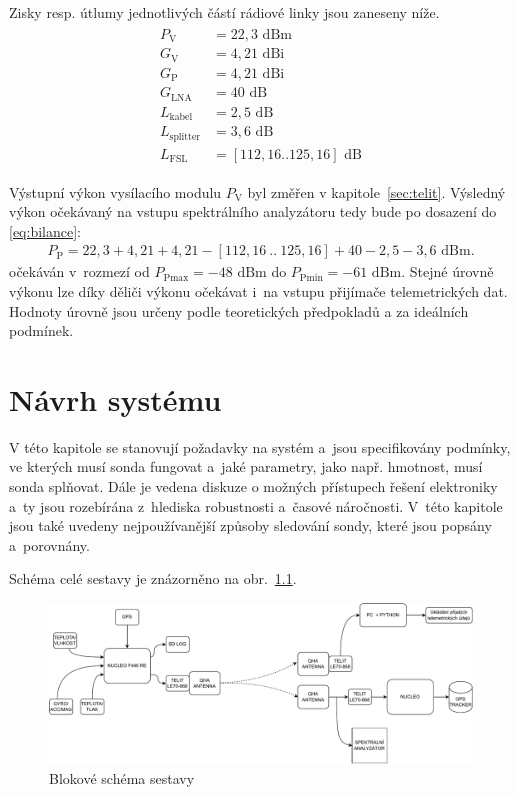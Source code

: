 \documentclass[twoside]{ctuthesis}
\newcommand{\mt}[1]{\text{#1}}
\theoremstyle{plain}
\theoremstyle{definition}
\theoremstyle{note}
\begin{document}
		Zisky resp. útlumy jednotlivých částí rádiové linky jsou zaneseny níže.
		\begin{align*}
			\begin{split}
				P_\mt{V} &= 22{,}3\mt{ dBm}\\
				G_\mt{V} &= 4{,}21\mt{ dBi}\\
				G_\mt{P} &= 4{,}21\mt{ dBi}\\
				G_\mt{LNA} &= 40 \mt{ dB}\\
				L_\mt{kabel} &= 2{,}5\mt{ dB}\\
				L_\mt{splitter} &= 3{,}6\mt{ dB}\\
				L_\mt{FSL} &= [112{,}16 .. 125{,}16]\mt{ dB}
			\end{split}
		\end{align*}

		Výstupní výkon vysílacího modulu $P_\mt{V}$ byl změřen v kapitole~\ref{sec:telit}. Výsledný výkon očekávaný na vstupu spektrálního analyzátoru tedy bude po dosazení do \eqref{eq:bilance}:
		\begin{align}
			P_\mt{P} = 22{,}3 + 4{,}21 + 4{,}21 - [112{,}16~..~125{,}16] + 40 - 2{,}5 - 3{,}6\mt{ dBm}.
		\end{align}
		očekáván v~rozmezí od $P_\mt{Pmax} = -48\mt{ dBm}$ do $P_\mt{Pmin} = -61\mt{ dBm}$. Stejné úrovně výkonu lze díky děliči výkonu očekávat i~na vstupu přijímače telemetrických dat. Hodnoty úrovně jsou určeny podle teoretických předpokladů a za ideálních podmínek. 















\chapter{Návrh systému}
V této kapitole se stanovují požadavky na systém a~jsou specifikovány podmínky, ve kterých musí sonda fungovat a~jaké parametry, jako např. hmotnost, musí sonda splňovat. Dále je vedena  diskuze o možných přístupech řešení elektroniky a~ty jsou rozebírána z~hlediska robustnosti a~časové náročnosti. V~této kapitole jsou také uvedeny nejpoužívanější způsoby sledování sondy, které jsou popsány a~porovnány.

Schéma celé sestavy je znázorněno na obr.~\ref{fig:sestava:blokac}.
\begin{figure}
	\centering
	\includegraphics[width=\textwidth]{Figures/sonda_blokac.drawio.pdf}
	\caption{Blokové schéma sestavy}
	\label{fig:sestava:blokac}
\end{figure}
\end{document}
